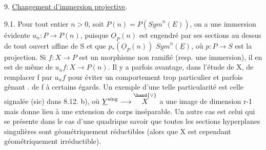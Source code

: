 
9. \uline{Changement d'immersion projective}.

9.1. Pour tout entier $n > 0$, soit $P(n) = P(\underline{Sym}^n(E))$, on a une
immersion évidente $u_n\colon P \to P(n)$, puisque $\underline{O}_P(n)$ est engendré par
ses sections au dessus de tout ouvert affine de S et que $p_*(\underline{O}_P(n))$
$\underline{Sym}^n(\underline{E})$, où $p\colon P \to S$ est la projection. Si $f\colon X\to P$ est un morphisme
non ramifié (resp. une immersion), il en est de même de $u_n f\colon X \to P(n)$.
Il y a parfois avantage, dans l'étude de X, de  remplacer f par $u_n f$ 
pour éviter un comportement trop particulier et parfois  gênant .
de f à certains égards. Un exemple d'une telle particularité est celle
 signalée (sic) dans 8.12. b),  où $\underline{Y}^{\mathrm{sing}} \longrightarrow \overset{\hand{\vee}}{X}$ a une image de
dimension r-1 mais  donne lieu à une extension
de corps inséparable. Un autre cas est celui qui se présente dans le cas
d'une quadrique  savoir que
toutes les sections hyperplanes singulières sont géométriquement
réductibles (alors que X est cependant géométriquement irréductible).

